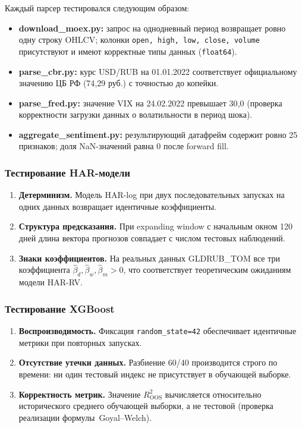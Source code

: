 Каждый парсер тестировался следующим образом:

\begin{itemize}
    \item \textbf{download\_moex.py:} запрос на однодневный период возвращает
          ровно одну строку OHLCV; колонки \texttt{open, high, low, close, volume}
          присутствуют и имеют корректные типы данных (\texttt{float64}).
    \item \textbf{parse\_cbr.py:} курс USD/RUB на 01.01.2022 соответствует
          официальному значению ЦБ РФ (74{,}29 руб.) с точностью до копейки.
    \item \textbf{parse\_fred.py:} значение VIX на 24.02.2022 превышает 30{,}0
          (проверка корректности загрузки данных о волатильности в период шока).
    \item \textbf{aggregate\_sentiment.py:} результирующий датафрейм содержит
          ровно 25 признаков; доля NaN-значений равна 0 после forward fill.
\end{itemize}

\subsubsection{Тестирование HAR-модели}

\begin{enumerate}
    \item \textbf{Детерминизм.}
          Модель HAR-log при двух последовательных запусках
          на одних данных возвращает идентичные коэффициенты.
    \item \textbf{Структура предсказания.}
          При expanding window с начальным окном 120 дней
          длина вектора прогнозов совпадает с числом тестовых наблюдений.
    \item \textbf{Знаки коэффициентов.}
          На реальных данных GLDRUB\_TOM все три коэффициента
          $\hat\beta_d, \hat\beta_w, \hat\beta_m > 0$,
          что соответствует теоретическим ожиданиям модели HAR-RV.
\end{enumerate}

\subsubsection{Тестирование XGBoost}

\begin{enumerate}
    \item \textbf{Воспроизводимость.}
          Фиксация \texttt{random\_state=42} обеспечивает идентичные метрики
          при повторных запусках.
    \item \textbf{Отсутствие утечки данных.}
          Разбиение 60/40 производится строго по времени:
          ни один тестовый индекс не присутствует в обучающей выборке.
    \item \textbf{Корректность метрик.}
          Значение $R^2_{\mathrm{OOS}}$ вычисляется относительно
          исторического среднего обучающей выборки,
          а не тестовой (проверка реализации формулы~Goyal--Welch).
\end{enumerate}

